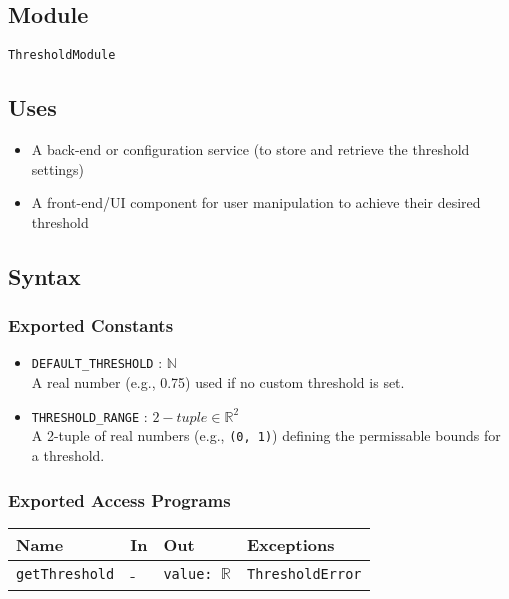 \documentclass[12pt, titlepage]{article}
\begin{document}
\begin{itemize}
\subsection{Module}

\texttt{ThresholdModule}

\subsection{Uses}

\begin{itemize}
    \item A back-end or configuration service (to store and retrieve the threshold settings)
    \item A front-end/UI component for user manipulation to achieve their desired threshold
\end{itemize}

\subsection{Syntax}

\subsubsection{Exported Constants}

\begin{itemize}
    \item \texttt{DEFAULT\_THRESHOLD} :  $\mathbb{N}$ \\
    A real number (e.g., 0.75) used if no custom threshold is set.
    \item \texttt{THRESHOLD\_RANGE} : $2-tuple \in \mathbb{R}^ 2 $ \\
    A 2-tuple of real numbers  (e.g., \texttt{(0, 1)}) defining the permissable bounds for a threshold.
\end{itemize}

\subsubsection{Exported Access Programs}

\begin{center}
\begin{tabular}{p{3.5cm} p{3.8cm} p{3cm} p{2.5cm}}
\hline
\textbf{Name} & \textbf{In} & \textbf{Out} & \textbf{Exceptions} \\
\hline
\texttt{getThreshold} 
  & - 
  & \texttt{value: $\mathbb{R}$} 
  & \texttt{ThresholdError} \\


\end{tabular}
\end{center}
\end{itemize}
\end{document}
